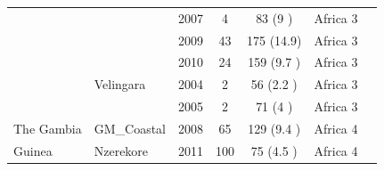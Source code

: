 \documentclass[9pt,lineno]{elife}
\begin{document}
\begin{table}[bt]
\begin{tabular}{l l c c c c c}
                &               &2007 &4    &83   (9   )&Africa 3\\
                &               &2009 &43   &175  (14.9)&Africa 3\\
                &               &2010 &24   &159  (9.7 )&Africa 3\\
                &Velingara      &2004 &2    &56   (2.2 )&Africa 3\\
                &               &2005 &2    &71   (4   )&Africa 3\\
 \hline
The Gambia      &GM\_Coastal    &2008 &65   &129  (9.4 )&Africa 4\\
 \hline
Guinea          &Nzerekore      &2011 &100  &75   (4.5 )&Africa 4\\
\bottomrule
\end{tabular}

\end{table}
\end{document}
